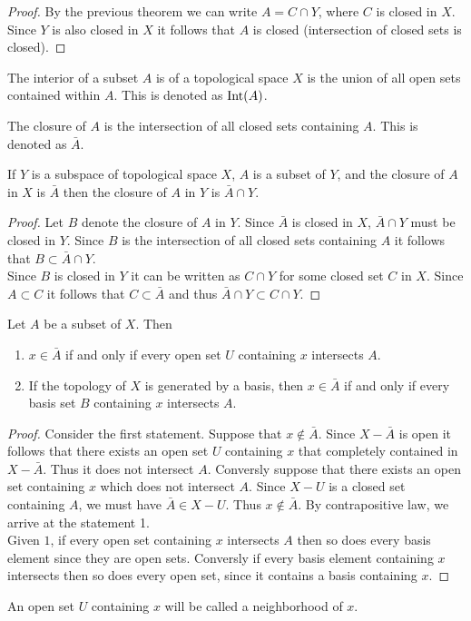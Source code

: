 \begin{proof}
  By the previous theorem we can write $A = C \cap Y$, where $C$ is closed in $X$. Since $Y$ is also closed in $X$ it follows that $A$ is closed (intersection of closed sets is closed).
\end{proof}
\begin{definition}
  The interior of a subset $A$ is of a topological space $X$ is the union of all open sets contained within $A$. This is denoted as $\text{Int}(A)$.
\end{definition}
\begin{definition}
  The closure of $A$ is the intersection of all closed sets containing $A$. This is denoted as $\bar{A}$.
\end{definition}
\begin{lemma}
  If $Y$ is a subspace of topological space $X$, $A$ is a subset of $Y$, and the closure of $A$ in $X$ is $\bar{A}$ then the closure of $A$ in $Y$ is $\bar{A}\cap Y$.
\end{lemma}
\begin{proof}
  Let $B$ denote the closure of $A$ in $Y$. Since $\bar{A}$ is closed in $X$, $\bar{A}\cap Y$ must be closed in $Y$. Since $B$ is the intersection of all closed sets containing $A$ it follows that $B\subset \bar{A}\cap Y$.\\

  Since $B$ is closed in $Y$ it can be written as $C\cap Y$ for some closed set $C$ in $X$. Since $A\subset C$ it follows that $C\subset \bar{A}$ and thus $\bar{A}\cap Y\subset C\cap Y$.
\end{proof}
\begin{theorem}
  Let $A$ be a subset of $X$. Then
  \begin{enumerate}
    \item $x\in \bar{A}$ if and only if every open set $U$ containing $x$ intersects $A$.
    \item If the topology of $X$ is generated by a basis, then $x\in \bar{A}$ if and only if every basis set $B$ containing $x$ intersects $A$.
  \end{enumerate}
\end{theorem}
\begin{proof}
  Consider the first statement. Suppose that $x\notin \bar{A}$. Since $X-\bar{A}$ is open it follows that there exists an open set $U$ containing $x$ that completely contained in $X-\bar{A}$. Thus it does not intersect $A$. Conversly suppose that there exists an open set containing $x$ which does not intersect $A$. Since $X-U$ is a closed set containing $A$, we must have $\bar{A} \in X-U$. Thus $x\notin \bar{A}$. By contrapositive law, we arrive at the statement 1.\\

  Given $1$, if every open set containing $x$ intersects $A$ then so does every basis element since they are open sets. Conversly if every basis element containing $x$ intersects then so does every open set, since it contains a basis containing $x$.
\end{proof}
\begin{notation}
  An open set $U$ containing $x$ will be called a neighborhood of $x$.
\end{notation}
